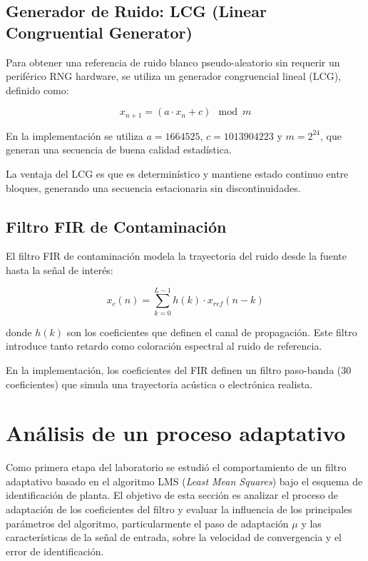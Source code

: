 \documentclass[12pt]{article}
\begin{document}
		\subsection{Generador de Ruido: LCG (Linear Congruential Generator)}

			Para obtener una referencia de ruido blanco pseudo-aleatorio sin requerir un periférico RNG hardware, se utiliza un generador congruencial lineal (LCG), definido como:

			\[
			x_{n+1} = (a \cdot x_n + c) \mod m
			\]

			En la implementación se utiliza $a = 1664525$, $c = 1013904223$ y $m = 2^{24}$, que generan una secuencia de buena calidad estadística.

			La ventaja del LCG es que es determinístico y mantiene estado continuo entre bloques, generando una secuencia estacionaria sin discontinuidades.

		\subsection{Filtro FIR de Contaminación}

			El filtro FIR de contaminación modela la trayectoria del ruido desde la fuente hasta la señal de interés:

			\[
			x_c(n) = \sum_{k=0}^{L-1} h(k) \cdot x_{ref}(n-k)
			\]

			donde $h(k)$ son los coeficientes que definen el canal de propagación. Este filtro introduce tanto retardo como coloración espectral al ruido de referencia.

			En la implementación, los coeficientes del FIR definen un filtro paso-banda (30 coeficientes) que simula una trayectoria acústica o electrónica realista.


		\section{Análisis de un proceso adaptativo}

			Como primera etapa del laboratorio se estudió el comportamiento de un filtro adaptativo basado en el algoritmo LMS (\textit{Least Mean Squares}) bajo el esquema de identificación de planta. El objetivo de esta sección es analizar el proceso de adaptación de los coeficientes del filtro y evaluar la influencia de los principales parámetros del algoritmo, particularmente el paso de adaptación $\mu$ y las características de la señal de entrada, sobre la velocidad de convergencia y el error de identificación.
\end{document}
